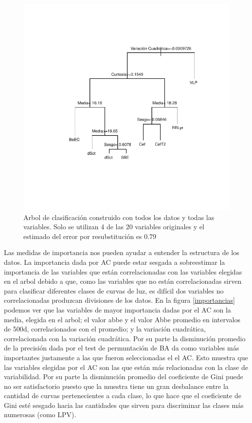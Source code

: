 \documentclass[letterpaper,12pt]{book}
\begin{document}
\begin{figure}
  \centering
  \includegraphics[width = \textwidth]{./img/CClasificacion/arbolTotal.pdf}
  \caption{Arbol de clasificación construido con todos los datos y todas las variables. Solo se utilizan 4 de las 20 variables originales y el estimado del error por resubstitución es 0.79}
  \label{fig:arbolTotal}
  \centering
\end{figure}

Las medidas de importancia nos pueden ayudar a entender la estructura de los datos. La importancia dada por AC puede estar sesgada a sobreestimar la importancia de las variables que están correlacionadas con las variables elegidas en el arbol debido a que, como las variables que no están correlacionadas sirven para clasificar diferentes clases de curvas de luz, es difícil dos variables no correlacionadas produzcan divisiones de los datos. En la figura \ref{importancias} podemos ver que las variables de mayor importancia dadas por el AC son la media, elegida en el arbol; el valor abbe y el valor Abbe promedio en intervalos de 500d, correlacionados con el promedio;  y la variación cuadrática, correlacionada con la variación cuadrática. Por su parte la disminución promedio de la precisión dada por el test de permuntación de BA da como variables más importantes justamente a las que fueron seleccionadas el el AC. Esto muestra que las variables elegidas por el AC son las que están más relacionadas con la clase de variabilidad. Por su parte la disminución promedio del coeficiente de Gini puede no ser satisfactorio puesto que la muestra tiene un gran desbalance entre la cantidad de curvas pertenecientes a cada clase, lo que hace que el coeficiente de Gini esté sesgado hacia las cantidades que sirven para discriminar las clases más numerosas (como LPV). 
\end{document}
